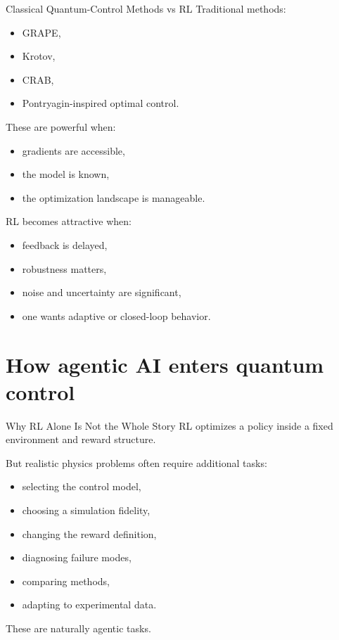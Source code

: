 \documentclass[aspectratio=169]{beamer}
\begin{document}
\begin{frame}{Classical Quantum-Control Methods vs RL}
Traditional methods:
\begin{itemize}
    \item GRAPE,
    \item Krotov,
    \item CRAB,
    \item Pontryagin-inspired optimal control.
\end{itemize}

These are powerful when:
\begin{itemize}
    \item gradients are accessible,
    \item the model is known,
    \item the optimization landscape is manageable.
\end{itemize}

RL becomes attractive when:
\begin{itemize}
    \item feedback is delayed,
    \item robustness matters,
    \item noise and uncertainty are significant,
    \item one wants adaptive or closed-loop behavior.
\end{itemize}
\end{frame}

\section{How agentic AI enters quantum control}

\begin{frame}{Why RL Alone Is Not the Whole Story}
RL optimizes a policy inside a fixed environment and reward structure.

But realistic physics problems often require additional tasks:
\begin{itemize}
    \item selecting the control model,
    \item choosing a simulation fidelity,
    \item changing the reward definition,
    \item diagnosing failure modes,
    \item comparing methods,
    \item adapting to experimental data.
\end{itemize}

These are naturally agentic tasks.
\end{frame}
\end{document}
